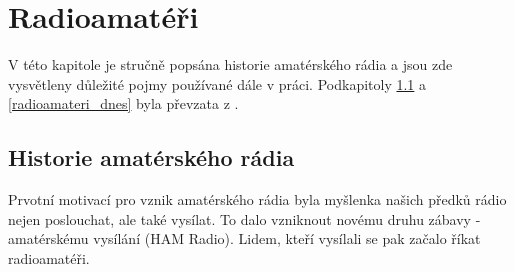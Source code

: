 

\chapter{Radioamatéři}
\label{radioamateri}

V této kapitole je stručně popsána historie amatérského rádia a jsou zde vysvětleny důležité pojmy používané dále v práci.
Podkapitoly \ref{radioamateri_hist} a \ref{radioamateri_dnes} byla převzata z \cite{crk_hist}.

\section{Historie amatérského rádia}
\label{radioamateri_hist}
Prvotní motivací pro vznik amatérského rádia%
byla myšlenka našich předků rádio %
nejen poslouchat, ale také vysílat.
To dalo vzniknout novému druhu zábavy - amatérskému vysílání (HAM Radio). Lidem, kteří vysílali se pak začalo říkat 
radioamatéři.

